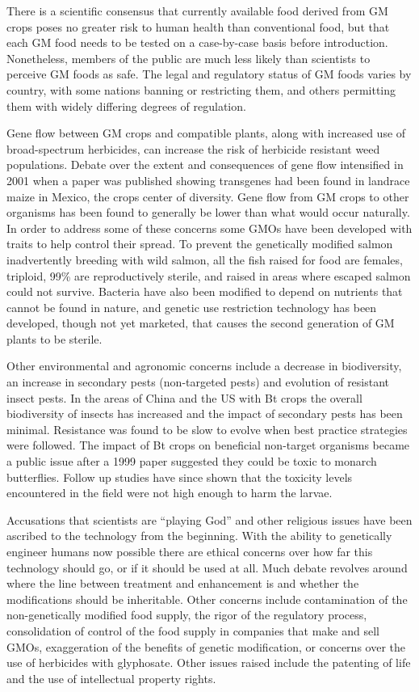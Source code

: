 There is a scientific consensus that currently available food derived from GM crops poses no greater risk to human health than conventional food, but that each GM food needs to be tested on a case-by-case basis before introduction. Nonetheless, members of the public are much less likely than scientists to perceive GM foods as safe. The legal and regulatory status of GM foods varies by country, with some nations banning or restricting them, and others permitting them with widely differing degrees of regulation.

Gene flow between GM crops and compatible plants, along with increased use of broad-spectrum herbicides, can increase the risk of herbicide resistant weed populations. Debate over the extent and consequences of gene flow intensified in 2001 when a paper was published showing transgenes had been found in landrace maize in Mexico, the crops center of diversity. Gene flow from GM crops to other organisms has been found to generally be lower than what would occur naturally. In order to address some of these concerns some GMOs have been developed with traits to help control their spread. To prevent the genetically modified salmon inadvertently breeding with wild salmon, all the fish raised for food are females, triploid, 99\% are reproductively sterile, and raised in areas where escaped salmon could not survive. Bacteria have also been modified to depend on nutrients that cannot be found in nature, and genetic use restriction technology has been developed, though not yet marketed, that causes the second generation of GM plants to be sterile.

Other environmental and agronomic concerns include a decrease in biodiversity, an increase in secondary pests (non-targeted pests) and evolution of resistant insect pests. In the areas of China and the US with Bt crops the overall biodiversity of insects has increased and the impact of secondary pests has been minimal. Resistance was found to be slow to evolve when best practice strategies were followed. The impact of Bt crops on beneficial non-target organisms became a public issue after a 1999 paper suggested they could be toxic to monarch butterflies. Follow up studies have since shown that the toxicity levels encountered in the field were not high enough to harm the larvae.

Accusations that scientists are ``playing God'' and other religious issues have been ascribed to the technology from the beginning. With the ability to genetically engineer humans now possible there are ethical concerns over how far this technology should go, or if it should be used at all. Much debate revolves around where the line between treatment and enhancement is and whether the modifications should be inheritable. Other concerns include contamination of the non-genetically modified food supply, the rigor of the regulatory process, consolidation of control of the food supply in companies that make and sell GMOs, exaggeration of the benefits of genetic modification, or concerns over the use of herbicides with glyphosate. Other issues raised include the patenting of life and the use of intellectual property rights.

